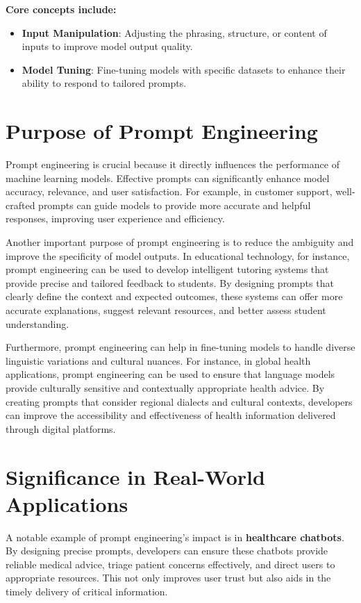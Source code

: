 \textbf{Core concepts include:}
\begin{itemize}
    \item \textbf{Input Manipulation}: Adjusting the phrasing, structure, or content of inputs to improve model output quality.
    \item \textbf{Model Tuning}: Fine-tuning models with specific datasets to enhance their ability to respond to tailored prompts.
\end{itemize}

\section{Purpose of Prompt Engineering}
Prompt engineering is crucial because it directly influences the performance of machine learning models. Effective prompts can significantly enhance model accuracy, relevance, and user satisfaction. For example, in customer support, well-crafted prompts can guide models to provide more accurate and helpful responses, improving user experience and efficiency.

Another important purpose of prompt engineering is to reduce the ambiguity and improve the specificity of model outputs. In educational technology, for instance, prompt engineering can be used to develop intelligent tutoring systems that provide precise and tailored feedback to students. By designing prompts that clearly define the context and expected outcomes, these systems can offer more accurate explanations, suggest relevant resources, and better assess student understanding.

Furthermore, prompt engineering can help in fine-tuning models to handle diverse linguistic variations and cultural nuances. For instance, in global health applications, prompt engineering can be used to ensure that language models provide culturally sensitive and contextually appropriate health advice. By creating prompts that consider regional dialects and cultural contexts, developers can improve the accessibility and effectiveness of health information delivered through digital platforms.

\section{Significance in Real-World Applications}
A notable example of prompt engineering's impact is in \textbf{healthcare chatbots}. By designing precise prompts, developers can ensure these chatbots provide reliable medical advice, triage patient concerns effectively, and direct users to appropriate resources. This not only improves user trust but also aids in the timely delivery of critical information.

